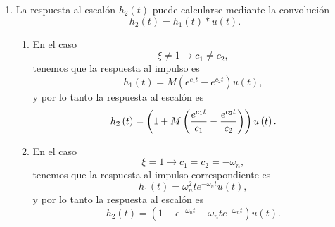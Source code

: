 \begin{enumerate}
\begin{enumerate}
\item  En cambio, si
\begin{equation}
\xi =1\rightarrow c_{1}=c_{2}=-\omega _{n},
\end{equation}
y 
\begin{equation}
H\left( j\omega \right) =
  \frac{\omega _{n}^{2}}{\left( j\omega -\omega_{n}\right) ^{2}},
\end{equation}
y la respuesta al impulso correspondiente es 
\begin{equation}
h_{1}\left( t\right) =\omega _{n}^{2}te^{-\omega _{n}t}u\left( t\right) .
\end{equation}
\end{enumerate}

\item  La respuesta al escal\'{o}n $h_{2}\left( t\right) $ puede calcularse mediante la convoluci\'{o}n 
\begin{equation}
h_{2}\left( t\right) = h_{1}\left( t\right) * u\left( t\right) .
\end{equation}

\begin{enumerate}
\item  En el caso 
\begin{equation}
\xi \neq 1\rightarrow c_{1}\neq c_{2},
\end{equation}
tenemos que la respuesta al impulso es 
\begin{equation}
h_{1}\left( t\right) =M\left( e^{c_{1}t}-e^{c_{2}t}\right) u\left( t\right) ,
\end{equation}
y por lo tanto la respuesta al escal\'{o}n es 
\begin{equation}
h_{2}\left( t\right) =\left( 1+M\left( \frac{e^{c_{1}t}}{c_{1}}-\frac{%
e^{c_{2}t}}{c_{2}}\right) \right) u\left( t\right) .
\end{equation}

\item  En el caso 
\begin{equation}
\xi =1\rightarrow c_{1}=c_{2}=-\omega _{n},
\end{equation}
tenemos que la respuesta al impulso correspondiente es 
\begin{equation}
h_{1}\left( t\right) =\omega _{n}^{2}te^{-\omega _{n}t}u\left( t\right) ,
\end{equation}
y por lo tanto la respuesta al escal\'{o}n es 
\begin{equation}
h_{2}\left( t\right) =\left( 1-e^{-\omega _{n}t}-\omega _{n}te^{-\omega
_{n}t}\right) u\left( t\right) .
\end{equation}
\end{enumerate}


\end{enumerate}

